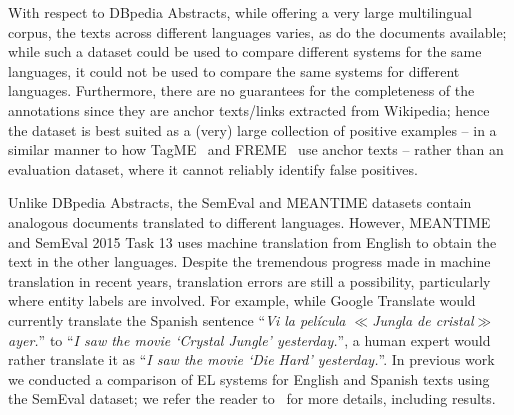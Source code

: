 \documentclass{llncs}
\begin{document}

With respect to DBpedia Abstracts, while offering a very large multilingual corpus, the texts across different languages varies, as do the documents available; while such a dataset could be used to compare different systems for the same languages, it could not be used to compare the same systems for different languages. Furthermore, there are no guarantees for the completeness of the annotations since they are anchor texts/links extracted from Wikipedia; hence the dataset is best suited as a (very) large collection of positive examples -- in a similar manner to how TagME~\cite{ferragina2010tagme} and FREME~\cite{freme-ner2016} use anchor texts -- rather than an evaluation dataset, where it cannot reliably identify false positives.

Unlike DBpedia Abstracts, the SemEval and MEANTIME datasets contain analogous documents translated to different languages. However, MEANTIME and SemEval 2015 Task 13 uses machine translation from English to obtain the text in the other languages. Despite the tremendous progress made in machine translation in recent years, translation errors are still a possibility, particularly where entity labels are involved. For example, while Google Translate would currently translate the Spanish sentence ``\textit{Vi la pel\'icula {\scriptsize$\ll$}Jungla de cristal{\scriptsize$\gg$ }ayer.}'' to ``\textit{I saw the movie `Crystal Jungle' yesterday.}'', a human expert would rather translate it as ``\textit{I saw the movie `Die Hard' yesterday.}''. In previous work we conducted a comparison of EL systems for English and Spanish texts using the SemEval dataset; we refer the reader to~\cite{Rosales-MendezP17} for more details, including results.

\end{document}
